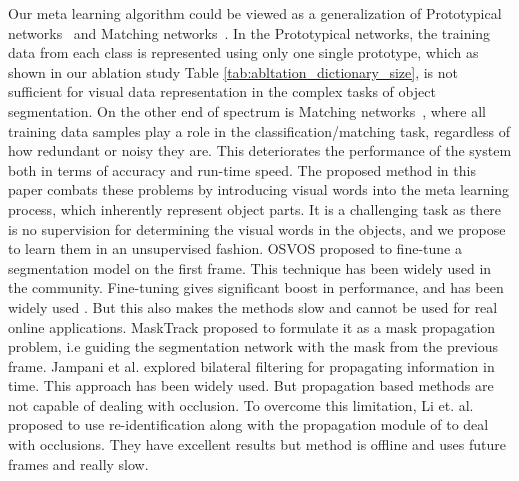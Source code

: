 \documentclass[10pt,twocolumn,letterpaper]{article}
\begin{document}
Our meta learning algorithm could be viewed as a generalization of Prototypical networks~\cite{NIPS2017_6996} and Matching networks~\cite{NIPS2016_6385}. In the Prototypical networks, the training data from each class is represented using only one single prototype, which as shown in our ablation study Table \ref{tab:abltation_dictionary_size}, is not sufficient for visual data representation in the complex tasks of object segmentation. 
On the other end of spectrum is Matching networks~\cite{NIPS2016_6385}, where all training data samples play a role in the classification/matching task, regardless of how redundant or noisy they are. This deteriorates the performance of the system both in terms of accuracy and run-time speed.
The proposed method in this paper combats these problems by introducing visual words into the meta learning process, which inherently represent object parts. It is a challenging task as there is no supervision for determining the visual words in the objects, and we propose to learn them in an unsupervised fashion. 
OSVOS \cite{Caelles_2017_CVPR} proposed to fine-tune a segmentation model on the first frame. This technique has been widely used in the community. Fine-tuning gives significant boost in performance, and has been widely used \cite{onavos,hu2017maskrnn, Cheng_2017_ICCV, masktrack, Jampani_2017_CVPR,lucid, Yoon_2017_ICCV, Ci_2018_ECCV}. But this also makes the methods slow and cannot be used for real online applications.
MaskTrack \cite{masktrack} proposed to formulate it as a mask propagation problem, i.e guiding the segmentation network with the mask from the previous frame.
Jampani et al. \cite{Jampani_2017_CVPR} explored bilateral filtering for propagating information in time.
This approach has been widely used. But propagation based methods are not capable of dealing with occlusion. To overcome this limitation, Li et. al. \cite{Li_2018_ECCV} proposed to use re-identification along with the propagation module of \cite{masktrack} to deal with occlusions. They have excellent results but method is offline and uses future frames and really slow.
\end{document}
